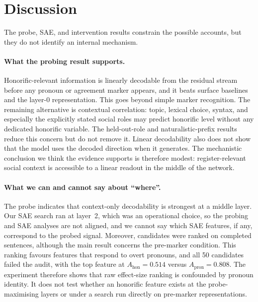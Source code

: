 \documentclass[11pt]{article}
\begin{document}
\section{Discussion}
\label{sec:failure}

The probe, SAE, and intervention results constrain the possible accounts, but
they do not identify an internal mechanism.

\paragraph{What the probing result supports.}
Honorific-relevant information is linearly decodable from the residual stream
before any pronoun or agreement marker appears, and it beats surface baselines
and the layer-0 representation. This goes beyond simple marker recognition. The
remaining alternative is contextual correlation: topic, lexical choice, syntax,
and especially the explicitly stated social roles may predict honorific level
without any dedicated honorific variable. The held-out-role and
naturalistic-prefix results reduce this concern but do not remove it. Linear
decodability also does not show that the model uses the decoded direction when
it generates. The mechanistic conclusion we think the evidence supports is
therefore modest: register-relevant social context is accessible to a linear
readout in the middle of the network.

\paragraph{What we can and cannot say about ``where''.}
The probe indicates that context-only decodability is strongest at a middle
layer. Our SAE search ran at layer~2, which was an operational choice, so the
probing and SAE analyses are not aligned, and we cannot say which SAE features,
if any, correspond to the probed signal. Moreover, candidates were ranked on
completed sentences, although the main result concerns the pre-marker condition.
This ranking favours features that respond to overt pronouns, and all 50
candidates failed the audit, with the top feature at $A_{\mathrm{hon}}=0.514$
versus $A_{\mathrm{pron}}=0.808$. The experiment therefore shows that raw
effect-size ranking is confounded by pronoun identity. It does not test whether
an honorific feature exists at the probe-maximising layers or under a search run
directly on pre-marker representations.
\end{document}
